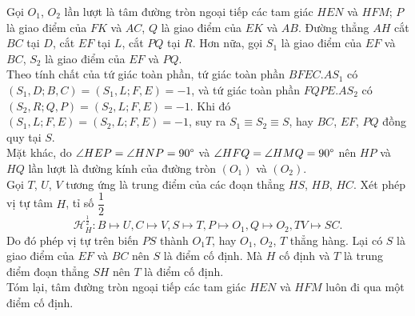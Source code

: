\begin{center}
        \end{center}

        \begin{solution}
            Gọi \(O_1\), \(O_2\) lần lượt là tâm đường tròn ngoại tiếp các tam giác \(HEN\) và \(HFM\); \(P\) là giao điểm của \(FK\) và \(AC\), \(Q\) là giao điểm của \(EK\) và \(AB\). Đường thẳng \(AH\) cắt \(BC\) tại \(D\), cắt \(EF\) tại \(L\), cắt \(PQ\) tại \(R\). Hơn nữa, gọi \(S_1\) là giao điểm của \(EF\) và \(BC\), \(S_2\) là giao điểm của \(EF\) và \(PQ\).\\
            Theo tính chất của tứ giác toàn phần, tứ giác toàn phần \(BFEC.AS_1\) có \((S_1,D;B,C) = (S_1,L;F,E) = -1\), và tứ giác toàn phần \(FQPE.AS_2\) có \((S_2,R;Q,P) = (S_2,L;F,E) = -1\). Khi đó \((S_1,L;F,E) = (S_2,L;F,E) = -1\), suy ra \(S_1 \equiv S_2 \equiv S\), hay \(BC\), \(EF\), \(PQ\) đồng quy tại \(S\).\\
            Mặt khác, do \(\angle HEP = \angle HNP = 90 \degree\) và \(\angle HFQ = \angle HMQ = 90 \degree\) nên \(HP\) và \(HQ\) lần lượt là đường kính của đường tròn \((O_1)\) và \((O_2)\).\\
            Gọi \(T\), \(U\), \(V\) tương ứng là trung điểm của các đoạn thẳng \(HS\), \(HB\), \(HC\). Xét phép vị tự tâm \(H\), tỉ số \(\dfrac{1}{2}\)
            \[\mathcal{H}_{H}^{\frac{1}{2}}: B \mapsto U, C \mapsto V, S \mapsto T, P \mapsto O_1, Q \mapsto O_2, TV \mapsto SC.\]
            Do đó phép vị tự trên biến \(PS\) thành \(O_1T\), hay \(O_1\), \(O_2\), \(T\) thẳng hàng. Lại có \(S\) là giao điểm của \(EF\) và \(BC\) nên \(S\) là điểm cố định. Mà \(H\) cố định và \(T\) là trung điểm đoạn thẳng \(SH\) nên \(T\) là điểm cố định.\\
            Tóm lại, tâm đường tròn ngoại tiếp các tam giác \(HEN\) và \(HFM\) luôn đi qua một điểm cố định.
        \end{solution}


